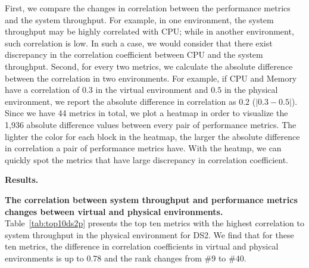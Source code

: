 First, we compare the changes in correlation between the performance metrics and the system throughput. For example, in one environment, the system throughput may be highly correlated with CPU; while in another environment, such correlation is low. In such a case, we would consider that there exist discrepancy in the correlation coefficient between CPU and the system throughput. Second, for every two metrics, we calculate the absolute difference between the correlation in two environments. For example, if CPU and Memory have a correlation of $0.3$ in the virtual environment and $0.5$ in the physical environment, we report the absolute difference in correlation as $0.2$ ($|0.3-0.5|$). Since we have 44 metrics in total, we plot a heatmap in order to visualize the 1,936 absolute difference values between every pair of performance metrics. The lighter the color for each block in the heatmap, the larger the absolute difference in correlation a pair of performance metrics have. With the heatmp, we can quickly spot the metrics that have large discrepancy in correlation coefficient. 





\noindent \textbf{Results.}

\noindent \textbf{The correlation between system throughput and performance metrics changes between virtual and physical environments.} Table~\ref{tab:top10ds2p} presents the top ten metrics with the highest correlation to system throughput in the physical environment for DS2. We find that for these ten metrics, the difference in correlation coefficients in virtual and physical environments is up to 0.78 and the rank changes from \#9 to \#40.

